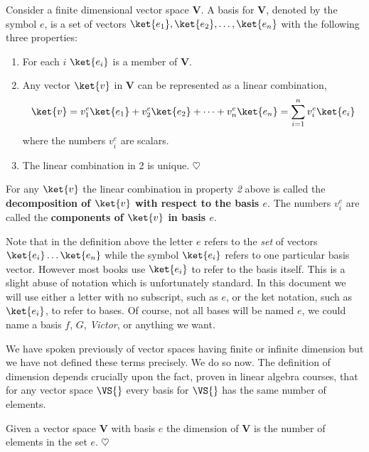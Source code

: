 \begin{definition}[Basis]
Consider a finite dimensional vector space \textbf{V}.
A basis for \textbf{V}, denoted by the symbol $e$, is a set of vectors \mbox{$\ket{e_1}, \ket{e_2}, \ldots, \ket{e_n}$} with the following three properties:
\begin{enumerate}
\item For each $i$ $\ket{e_i}$ is a member of \textbf{V}.
\item Any vector $\ket{v}$ in \textbf{V} can be represented as a linear combination,
\begin{displaymath}
\ket{v} = v^{e}_{1}\ket{e_1} + v^{e}_{2}\ket{e_2} + \cdots + v^{e}_{n}\ket{e_n} = \sum_{i=1}^{n} v^{e}_{i}\ket{e_i}
\end{displaymath}
where the numbers $v_i^e$ are scalars.
\item The linear combination in 2 is unique. \qquad $\heartsuit$
\end{enumerate}
\end{definition}

For any $\ket{v}$ the linear combination in property \textit{2} above is called the \textbf{decomposition of $\ket{v}$ with respect to the basis $e$}.
The numbers $v^{e}_i$ are called the \textbf{components of $\ket{v}$ in basis $e$}.

Note that in the definition above the letter $e$ refers to the \textit{set} of vectors \mbox{$\ket{e_i} \ldots \ket{e_n}$} while the symbol $\ket{e_i}$ refers to one particular basis vector.
However most books use $\ket{e_i}$ to refer to the basis itself.
This is a slight abuse of notation which is unfortunately standard.
In this document we will use either a letter with no subscript, such as $e$, or the ket notation, such as $\ket{e_i}$, to refer to bases.
Of course, not all bases will be named $e$, we could name a basis $f$, $G$, \textit{Victor}, or anything we want.

We have spoken previously of vector spaces having finite or infinite dimension but we have not defined these terms precisely.
We do so now.
The definition of dimension depends crucially upon the fact, proven in linear algebra courses, that for any vector space $\VS{}$ every basis for $\VS{}$ has the same number of elements.

\begin{definition}[Dimension]
Given a vector space \textbf{V} with basis $e$ the dimension of \textbf{V} is the number of elements in the set $e$. \qquad $\heartsuit$
\end{definition}

